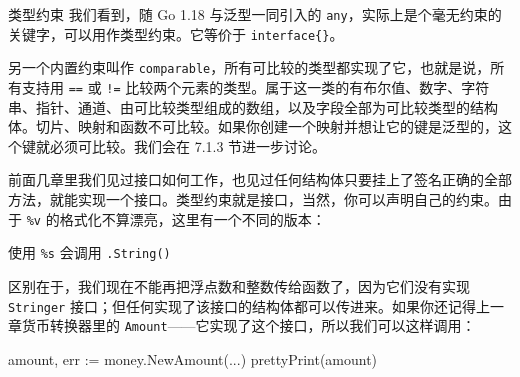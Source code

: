 \begin{infobox}{类型约束}
我们看到，随 Go 1.18 与泛型一同引入的 \texttt{any}，实际上是个毫无约束的关键字，可以用作类型约束。它等价于 \texttt{interface\{\}}。

另一个内置约束叫作 \texttt{comparable}，所有可比较的类型都实现了它，也就是说，所有支持用 \texttt{==} 或 \texttt{!=} 比较两个元素的类型。属于这一类的有布尔值、数字、字符串、指针、通道、由可比较类型组成的数组，以及字段全部为可比较类型的结构体。切片、映射和函数不可比较。如果你创建一个映射并想让它的键是泛型的，这个键就必须可比较。我们会在 7.1.3 节进一步讨论。

前面几章里我们见过接口如何工作，也见过任何结构体只要挂上了签名正确的全部方法，就能实现一个接口。类型约束就是接口，当然，你可以声明自己的约束。由于 \texttt{\%v} 的格式化不算漂亮，这里有一个不同的版本：


\begin{codeannotations}
\item 使用 \texttt{\%s} 会调用 \texttt{.String()}
\end{codeannotations}

区别在于，我们现在不能再把浮点数和整数传给函数了，因为它们没有实现 \texttt{Stringer} 接口；但任何实现了该接口的结构体都可以传进来。如果你还记得上一章货币转换器里的 \texttt{Amount}——它实现了这个接口，所以我们可以这样调用：

\begin{gocode}[]
amount, err := money.NewAmount(...)
prettyPrint(amount)
\end{gocode}
\end{infobox}

